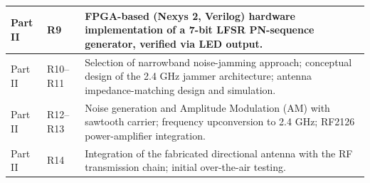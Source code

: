 \documentclass[12pt,a4paper]{report}
\begin{document}
\begin{longtable}{|p{2cm}|p{2cm}|p{10cm}|}
		Part II & R9 &
		FPGA-based (Nexys 2, Verilog) hardware implementation of a 7-bit LFSR PN-sequence generator, verified via LED output. \\
		\hline
		
		Part II & R10--R11 &
		Selection of narrowband noise-jamming approach; conceptual design of the 2.4 GHz jammer architecture; antenna impedance-matching design and simulation. \\
		\hline
		
		Part II & R12--R13 &
		Noise generation and Amplitude Modulation (AM) with sawtooth carrier; frequency upconversion to 2.4 GHz; RF2126 power-amplifier integration. \\
		\hline
		
		Part II & R14 &
		Integration of the fabricated directional antenna with the RF transmission chain; initial over-the-air testing. \\
		\hline
		
	\end{longtable}
\end{document}
